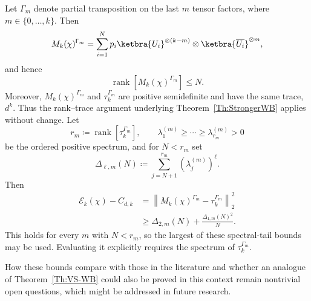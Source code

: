 \documentclass[aps,twocolumn,pra,superscriptaddress,nofootinbib]{revtex4-2}
\begin{document}
Let $\mathsf{\Gamma}_m$ denote partial transposition on the last $m$ tensor factors, where $m\in\{0,\dotsc,k\}$.
Then
\begin{equation}
    M_k(\chi)^{{\mathsf{\Gamma}_m}}
    =
    \sum_{i=1}^{N}p_i
    \ketbra{U_i}^{\otimes(k-m)}
    \otimes
    \ketbra{\overline{U_i}}^{\otimes m},
\end{equation}
and hence
\begin{equation}
    \operatorname{rank}\!\left[M_k(\chi)^{{\mathsf{\Gamma}_m}}\right]\leq N.
\end{equation}
{Moreover, $M_k(\chi)^{\mathsf{\Gamma}_m}$ and $\tau_k^{\mathsf{\Gamma}_m}$ are positive semidefinite and have the same trace, $d^k$. Thus the rank--trace argument underlying Theorem~\ref{Th:StrongerWB} applies without change. Let}
\begin{equation}
    {r_m\coloneqq\operatorname{rank}\!\left[\tau_k^{\mathsf{\Gamma}_m}\right],
    \qquad
    \lambda_1^{(m)}\geq\cdots\geq\lambda_{r_m}^{(m)}>0}
\end{equation}
{be the ordered positive spectrum, and for $N<r_m$ set}
\begin{equation}
    {\Delta_{\ell,m}(N)
    \coloneqq
    \sum_{j=N+1}^{r_m}\left(\lambda_j^{(m)}\right)^\ell.}
\end{equation}
{Then}
\begin{align}
    {\mathcal E_k(\chi)-C_{d,k}}
    &{=\left\|M_k(\chi)^{\mathsf{\Gamma}_m}-\tau_k^{\mathsf{\Gamma}_m}\right\|_2^2}
    \\
    &{\geq \Delta_{2,m}(N)+\frac{\Delta_{1,m}(N)^2}{N}.}
\end{align}
{This holds for every $m$ with $N<r_m$, so the largest of these spectral-tail bounds may be used. Evaluating it explicitly requires the spectrum of $\tau_k^{\mathsf{\Gamma}_m}$.}



{How these bounds compare with those in the literature} \cite{BrandaoHarrowHorodecki2016,BrandaoEtAl2021,LancienMajenz2020,NakataEtAl2025,BrakerskiYuen2026} and whether an analogue of {Theorem~\ref{Th:VS-WB}} could also be proved in this context remain {nontrivial} open questions, which might be addressed in future research.
\end{document}
